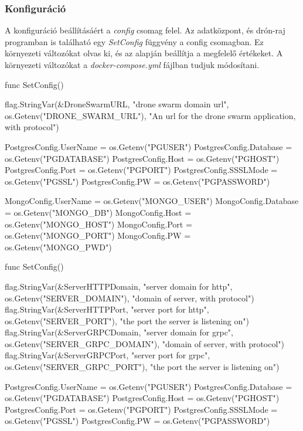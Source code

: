 
\subsubsection{Konfiguráció}
A konfiguráció beállításáért a \textit{config} csomag felel.
Az adatközpont, és drón-raj programban is található egy \textit{SetConfig} függvény a config csomagban.
Ez környezeti változókat olvas ki, és az alapján beállítja a megfelelő értékeket.
A környezeti változókat a \textit{docker-compose.yml} fájlban tudjuk módosítani.

\begin{python}
    func SetConfig() {
        flag.StringVar(&DroneSwarmURL, "drone swarm domain url", os.Getenv("DRONE_SWARM_URL"),
        "An url for the drone swarm application, with protocol")

        PostgresConfig.UserName = os.Getenv("PGUSER")
        PostgresConfig.Database = os.Getenv("PGDATABASE")
        PostgresConfig.Host = os.Getenv("PGHOST")
        PostgresConfig.Port = os.Getenv("PGPORT")
        PostgresConfig.SSSLMode = os.Getenv("PGSSL")
        PostgresConfig.PW = os.Getenv("PGPASSWORD")

        MongoConfig.UserName = os.Getenv("MONGO_USER")
        MongoConfig.Database = os.Getenv("MONGO_DB")
        MongoConfig.Host = os.Getenv("MONGO_HOST")
        MongoConfig.Port = os.Getenv("MONGO_PORT")
        MongoConfig.PW = os.Getenv("MONGO_PWD")
    }
\end{python}

\begin{python}
    func SetConfig() {
        flag.StringVar(&ServerHTTPDomain, "server domain for http", os.Getenv("SERVER_DOMAIN"), "domain of server, with protocol")
        flag.StringVar(&ServerHTTPPort, "server port for http", os.Getenv("SERVER_PORT"), "the port the server is listening on")
        flag.StringVar(&ServerGRPCDomain, "server domain for grpc", os.Getenv("SERVER_GRPC_DOMAIN"), "domain of server, with protocol")
        flag.StringVar(&ServerGRPCPort, "server port for grpc", os.Getenv("SERVER_GRPC_PORT"), "the port the server is listening on")

        PostgresConfig.UserName = os.Getenv("PGUSER")
        PostgresConfig.Database = os.Getenv("PGDATABASE")
        PostgresConfig.Host = os.Getenv("PGHOST")
        PostgresConfig.Port = os.Getenv("PGPORT")
        PostgresConfig.SSSLMode = os.Getenv("PGSSL")
        PostgresConfig.PW = os.Getenv("PGPASSWORD")
    }
\end{python}



